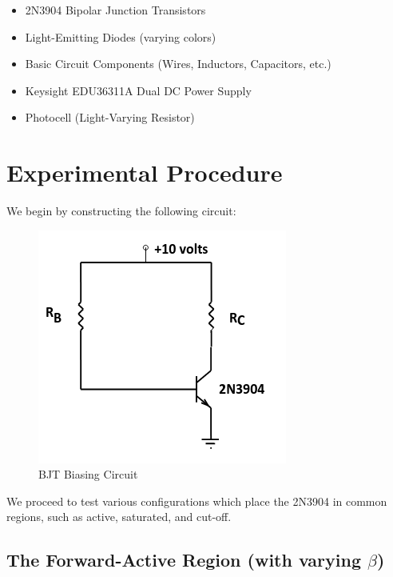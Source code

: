 \documentclass[
	letterpaper, %
	10pt, %
]{CSUniSchoolLabReport}
\begin{document}
\begin{itemize}

  \item 2N3904 Bipolar Junction Transistors

  \item Light-Emitting Diodes (varying colors)

  \item Basic Circuit Components (Wires, Inductors, Capacitors, etc.)

  \item Keysight EDU36311A Dual DC Power Supply

  \item Photocell (Light-Varying Resistor)

\end{itemize}

\newpage

\section{Experimental Procedure}

We begin by constructing the following circuit:

\begin{figure}[H]
  \centering
  \includegraphics[width=.7\textwidth]{Figures/L3F1}
  \caption{BJT Biasing Circuit}
  \label{fig:1}
\end{figure}

We proceed to test various configurations which place the 2N3904 in common regions, such as active, saturated, and cut-off.

\subsection{The Forward-Active Region (with varying $\beta$)}
\end{document}
